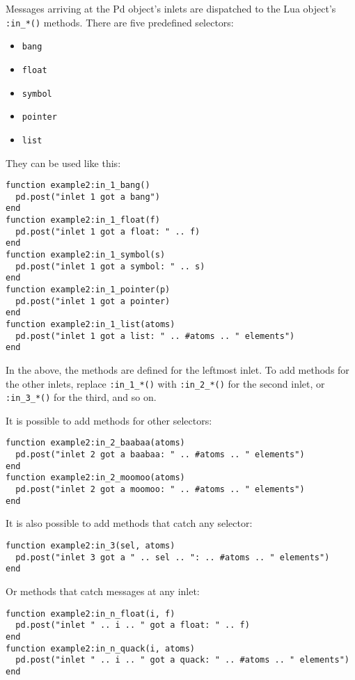 \documentclass{article}
\begin{document}
Messages arriving at the Pd object's inlets are dispatched to the Lua
object's {\tt :in\_*()} methods.  There are five predefined selectors:

\begin{itemize}
\item {\tt bang}
\item {\tt float}
\item {\tt symbol}
\item {\tt pointer}
\item {\tt list}
\end{itemize}

They can be used like this:

\begin{verbatim}
function example2:in_1_bang()
  pd.post("inlet 1 got a bang")
end
function example2:in_1_float(f)
  pd.post("inlet 1 got a float: " .. f)
end
function example2:in_1_symbol(s)
  pd.post("inlet 1 got a symbol: " .. s)
end
function example2:in_1_pointer(p)
  pd.post("inlet 1 got a pointer)
end
function example2:in_1_list(atoms)
  pd.post("inlet 1 got a list: " .. #atoms .. " elements")
end
\end{verbatim}

In the above, the methods are defined for the leftmost inlet.  To add
methods for the other inlets, replace {\tt :in\_1\_*()} with
{\tt :in\_2\_*()} for the second inlet, or {\tt :in\_3\_*()} for the third,
and so on.

It is possible to add methods for other selectors:

\begin{verbatim}
function example2:in_2_baabaa(atoms)
  pd.post("inlet 2 got a baabaa: " .. #atoms .. " elements")
end
function example2:in_2_moomoo(atoms)
  pd.post("inlet 2 got a moomoo: " .. #atoms .. " elements")
end
\end{verbatim}

It is also possible to add methods that catch any selector:

\begin{verbatim}
function example2:in_3(sel, atoms)
  pd.post("inlet 3 got a " .. sel .. ": .. #atoms .. " elements")
end
\end{verbatim}

Or methods that catch messages at any inlet:

\begin{verbatim}
function example2:in_n_float(i, f)
  pd.post("inlet " .. i .. " got a float: " .. f)
end
function example2:in_n_quack(i, atoms)
  pd.post("inlet " .. i .. " got a quack: " .. #atoms .. " elements")
end
\end{verbatim}
\end{document}
